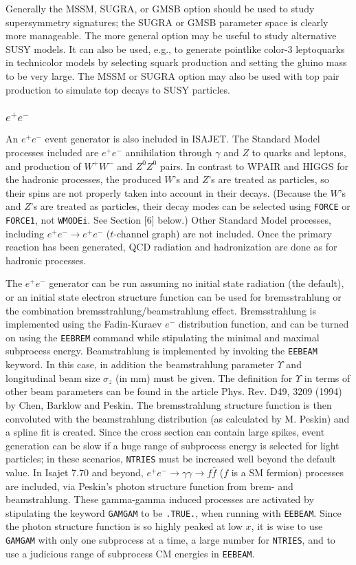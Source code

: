       Generally the MSSM, SUGRA, or GMSB option should be used to study
supersymmetry signatures; the SUGRA or GMSB parameter space is clearly
more manageable. The more general option may be useful to study
alternative SUSY models. It can also be used, e.g., to generate
pointlike color-3 leptoquarks in technicolor models by selecting squark
production and setting the gluino mass to be very large. The MSSM or
SUGRA option may also be used with top pair production to simulate top
decays to SUSY particles.

\subsubsection{$e^+e^-$} An $e^+e^-$ event generator is also included in
ISAJET. The
Standard Model processes included are $e^+e^-$ annihilation through
$\gamma$ and $Z$ to quarks and leptons, and production of $W^+W^-$ and
$Z^0Z^0$ pairs. In contrast to WPAIR and HIGGS for the hadronic
processes, the produced $W$'s and $Z$'s are treated as particles, so
their spins are not properly taken into account in their decays.
(Because the $W$'s and $Z$'s are treated as particles, their decay
modes can be selected using \verb|FORCE| or \verb|FORCE1|, not
\verb|WMODEi|. See Section [6] below.)  Other Standard Model
processes, including $e^+ e^- \to e^+ e^-$ ($t$-channel graph) 
are not included.  Once the primary reaction has been
generated, QCD radiation and hadronization are done as for hadronic
processes. 

The $e^+e^-$ generator can be run assuming no initial state
radiation (the default), or an initial state electron structure function
can be used for bremsstrahlung or the combination bremsstrahlung/beamstrahlung
effect. Bremsstrahlung is implemented using the Fadin-Kuraev
$e^-$ distribution function, and can be turned on using the \verb|EEBREM|
command while stipulating the minimal and maximal subprocess energy.
Beamstrahlung is implemented by invoking the \verb|EEBEAM| keyword.
In this case, in addition the beamstrahlung parameter $\Upsilon$ and
longitudinal beam size $\sigma_z$ (in mm) must be given.
The definition for $\Upsilon$ in terms of other beam parameters can be 
found in the article Phys. Rev. D49, 3209 (1994) by Chen, Barklow and Peskin.
The bremsstrahlung structure function is then convoluted with the 
beamstrahlung distribution (as calculated by M. Peskin) and a spline fit
is created. Since the cross section can contain large spikes, event generation
can be slow if a huge range of subprocess energy is selected for light 
particles; in these scenarios, \verb|NTRIES| must be increased well beyond
the default value.
In Isajet 7.70 and beyond, $e^+e^-\to\gamma\gamma\to f\bar{f}$ 
($f$ is a SM fermion) processes are included, via Peskin's 
photon structure function from brem- and beamstrahlung. These
gamma-gamma induced processes are activated by stipulating the keyword
\verb|GAMGAM| to be \verb|.TRUE.|, when running with \verb|EEBEAM|.
Since the photon structure function is so highly peaked at low $x$, 
it is wise to use \verb|GAMGAM| with only one subprocess at a time, 
a large number for \verb|NTRIES|, and to
use a judicious range of subprocess CM energies in \verb|EEBEAM|.

